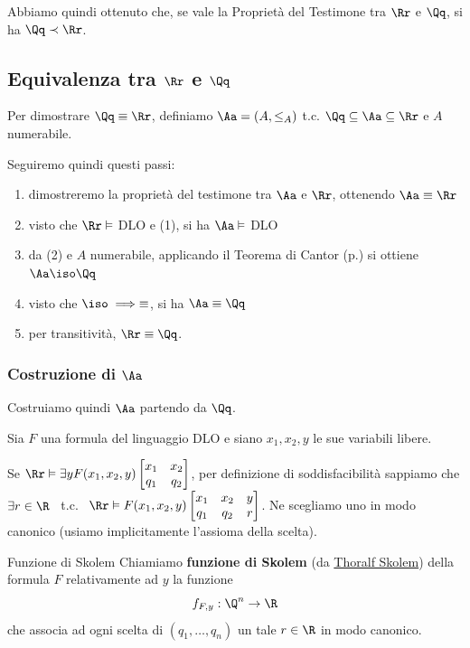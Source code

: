 \documentclass[a4paper,11pt]{report}
\begin{document}
Abbiamo quindi ottenuto che, se vale la Proprietà del Testimone tra \( \Rr \) e \( \Qq \), si ha \( \Qq \prec \Rr \).

\subsection{Equivalenza tra \( \Rr \) e \( \Qq \)}

Per dimostrare \( \Qq \equiv \Rr \), definiamo \( \Aa = (A, \leq_A) \) t.c. \( \Qq \subseteq \Aa \subseteq \Rr \) e \( A \) numerabile. 

Seguiremo quindi questi passi:
\vspace{-0.5em}
\begin{enumerate}
    \item dimostreremo la proprietà del testimone tra \( \Aa \) e \( \Rr \), ottenendo \( \Aa \equiv \Rr \)
    \item visto che \( \Rr \vDash\) DLO e (1), si ha \( \Aa \vDash \) DLO
    \item da (2) e \( A \) numerabile, applicando il Teorema di Cantor (p.\pageref{thm:Cantor}) si ottiene \( \Aa \iso \Qq \)
    \item visto che \( \iso \implies \equiv \), si ha \( \Aa \equiv \Qq \)
    \item per transitività, \( \Rr \equiv \Qq \).
\end{enumerate}

\subsubsection{Costruzione di \( \Aa \)}
Costruiamo quindi \( \Aa \) partendo da \( \Qq \).

Sia \( F \) una formula del linguaggio DLO e siano \( x_1, x_2, y \) le sue variabili libere.

Se \( \Rr \vDash \exists y F(x_1, x_2, y) \tworowmatrix{x_1 & x_2}{q_1 & q_2} \), per definizione di soddisfacibilità sappiamo che 
\\\( \exists r \in \R\) \ t.c. \ \( \Rr \vDash F(x_1, x_2, y) \tworowmatrix{x_1 & x_2 & y}{q_1 & q_2 & r} \). Ne scegliamo uno in modo canonico {\color{gray}(usiamo implicitamente l'assioma della scelta)}.

\begin{defframe}{Funzione di Skolem}{}
    Chiamiamo \textbf{funzione di Skolem} (da \href{https://en.wikipedia.org/wiki/Thoralf_Skolem}{Thoralf Skolem}) della formula \( F \) relativamente ad \( y \) la funzione 
    \[ f_{F, y} : \Q^n \to \R \]
    che associa ad ogni scelta di \( (q_1, \dots, q_n) \) un tale \( r \in \R \) in modo canonico.
\end{defframe}
\end{document}
